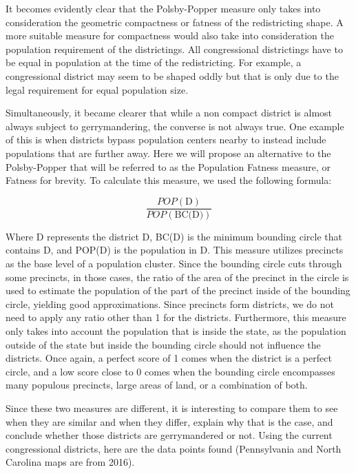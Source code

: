\documentclass[letterpaper]{article}
\begin{document}
It becomes evidently clear that the Polsby-Popper measure only takes into consideration the geometric compactness or fatness of the redistricting shape. A more suitable measure for compactness would also take into consideration the population requirement of the districtings. All congressional districtings have to be equal in population at the time of the redistricting. For example, a congressional district may seem to be shaped oddly but that is only due to the legal requirement for equal population size.

Simultaneously, it became clearer that while a non compact district is almost always subject to gerrymandering, the converse is not always true. One example of this is when districts bypass population centers nearby to instead include populations that are further away.
Here we will propose an alternative to the Polsby-Popper that will be referred to as the Population Fatness measure, or Fatness for brevity. 
To calculate this measure, we used the following formula:

\[
	\frac{POP(\text{D})}{POP(\text{BC(D)})}
\]

Where D represents the district D, BC(D) is the minimum bounding circle that contains D, and POP(D) is the population in D. This measure utilizes precincts as the base level of a population cluster. Since the bounding circle cuts through some precincts, in those cases, the ratio of the area of the precinct in the circle is used to estimate the population of the part of the precinct inside of the bounding circle, yielding good approximations. Since precincts form districts, we do not need to apply any ratio other than 1 for the districts. Furthermore, this measure only takes into account the population that is inside the state, as the population outside of the state but inside the bounding circle should not influence the districts. Once again, a perfect score of 1 comes when the district is a perfect circle, and a low score close to 0 comes when the bounding circle encompasses many populous precincts, large areas of land, or a combination of both.


Since these two measures are different, it is interesting to compare them to see when they are similar and when they differ, explain why that is the case, and conclude whether those districts are gerrymandered or not. Using the current congressional districts, here are the data points found (Pennsylvania and North Carolina maps are from 2016).
\end{document}

